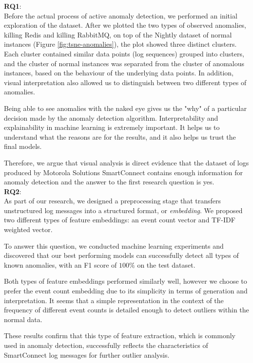 \textbf{RQ1}: \textit{\RQFirst}\\

Before the actual process of active anomaly detection, we performed an initial exploration of the dataset. After we plotted the two types of observed anomalies, killing Redis and killing RabbitMQ, on top of the Nightly dataset of normal instances (Figure \ref{fig:tsne-anomalies}), the plot showed three distinct clusters. Each cluster contained similar data points (log sequences) grouped into clusters, and the cluster of normal instances was separated from the cluster of anomalous instances, based on the behaviour of the underlying data points. In addition, visual interpretation also allowed us to distinguish between two different types of anomalies.

Being able to see anomalies with the naked eye gives us the "why" of a particular decision made by the anomaly detection algorithm. Interpretability and explainability in machine learning is extremely important. It helps us to understand what the reasons are for the results, and it also helps us trust the final models.

Therefore, we argue that visual analysis is direct evidence that the dataset of logs produced by Motorola Solutions SmartConnect contains enough information for anomaly detection and the answer to the first research question is yes. \\

\textbf{RQ2}: \textit{\RQSecond}\\

As part of our research, we designed a preprocessing stage that transfers unstructured log messages into a structured format, or \textit{embedding}. We proposed two different types of feature embeddings: an event count vector and TF-IDF weighted vector.

To answer this question, we conducted machine learning experiments and discovered that our best performing models can successfully detect all types of known anomalies, with an F1 score of $100 \%$ on the test dataset.

Both types of feature embeddings performed similarly well, however we choose to prefer the event count embedding due to its simplicity in terms of generation and interpretation. It seems that a simple representation in the context of the frequency of different event counts is detailed enough to detect outliers within the normal data. 

These results confirm that this type of feature extraction, which is commonly used in anomaly detection, successfully reflects the characteristics of SmartConnect log messages for further outlier analysis.\\

